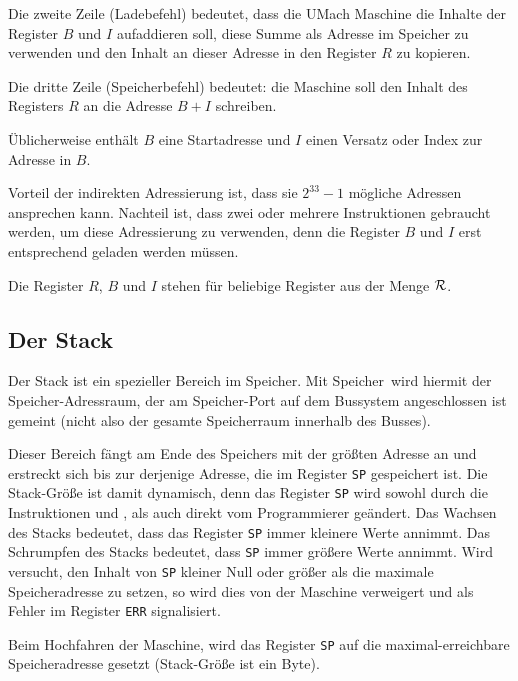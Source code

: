 Die zweite Zeile (Ladebefehl) bedeutet, dass die UMach Maschine die Inhalte der
Register $B$ und $I$ aufaddieren soll, diese Summe als Adresse im
Speicher zu verwenden und den Inhalt an dieser Adresse in den Register $R$ zu
kopieren.

Die dritte Zeile (Speicherbefehl) bedeutet: die Maschine soll den Inhalt des
Registers $R$ an die Adresse $B + I$ schreiben.

Üblicherweise enthält $B$ eine Startadresse und $I$ einen Versatz oder Index zur
Adresse in $B$.

Vorteil der indirekten Adressierung ist, dass sie $2^{33} - 1$ mögliche Adressen
ansprechen kann. Nachteil ist, dass zwei oder mehrere Instruktionen gebraucht
werden, um diese Adressierung zu verwenden, denn die Register $B$ und $I$ erst
entsprechend geladen werden müssen.

Die Register $R$, $B$ und $I$ stehen für beliebige Register aus der Menge
$\mathcal{R}$.



\subsection{Der Stack}
\label{subsec:Stack}

Der Stack ist ein spezieller Bereich im Speicher. Mit \glqq Speicher\grqq\ wird
hiermit der Speicher-Adressraum, der am Speicher-Port auf dem Bussystem
angeschlossen ist gemeint (nicht also der gesamte Speicherraum innerhalb des Busses).

Dieser Bereich fängt am Ende des Speichers mit der größten Adresse an und
erstreckt sich bis zur derjenige Adresse, die im Register \texttt{SP}
gespeichert ist. Die Stack-Größe ist damit dynamisch, denn das Register
\texttt{SP} wird sowohl durch die Instruktionen  und  , als
auch direkt vom Programmierer geändert.
Das Wachsen
des Stacks bedeutet, dass das Register \texttt{SP} immer kleinere Werte annimmt.
Das Schrumpfen
des Stacks bedeutet, dass \texttt{SP} immer größere Werte annimmt. 
Wird versucht, den Inhalt von \texttt{SP} kleiner Null oder größer als die
maximale Speicheradresse zu setzen, so wird dies von der Maschine verweigert und
als Fehler im Register \texttt{ERR} signalisiert.

Beim Hochfahren der Maschine, wird das Register \texttt{SP} auf die
maximal-erreichbare Speicheradresse gesetzt (Stack-Größe ist ein Byte).


